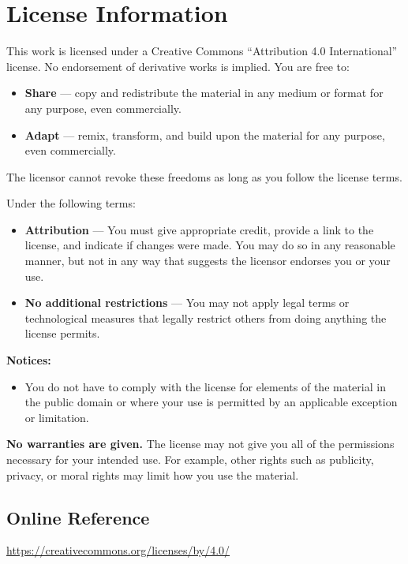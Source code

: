 \chapter{License Information}
This work is licensed under a Creative Commons “Attribution 4.0 International” license. No endorsement of derivative works is implied.
\noindent
You are free to:
\begin{itemize}
    \item \textbf{Share} — copy and redistribute the material in any medium or format for any purpose, even commercially.
    \item \textbf{Adapt} — remix, transform, and build upon the material for any purpose, even commercially.
\end{itemize}
The licensor cannot revoke these freedoms as long as you follow the license terms.

\noindent
Under the following terms:
\begin{itemize}
    \item \textbf{Attribution} — You must give appropriate credit, provide a link to the license, and indicate if changes were made. You may do so in any reasonable manner, but not in any way that suggests the licensor endorses you or your use.
    \item \textbf{No additional restrictions} — You may not apply legal terms or technological measures that legally restrict others from doing anything the license permits.
\end{itemize}

\noindent
\textbf{Notices:}
\begin{itemize}
    \item You do not have to comply with the license for elements of the material in the public domain or where your use is permitted by an applicable exception or limitation.
\end{itemize}

\noindent
\textbf{No warranties are given.} The license may not give you all of the permissions necessary for your intended use. For example, other rights such as publicity, privacy, or moral rights may limit how you use the material.

\section{Online Reference}
\href{https://creativecommons.org/licenses/by/4.0/}{https://creativecommons.org/licenses/by/4.0/}

\clearpage